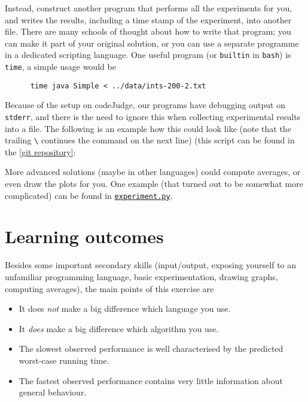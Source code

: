 \documentclass{tufte-handout}
\begin{document}
\begin{description}
    Instead, construct another program that performs all the experiments for you, and writes the results, including a time stamp of the experiment, into another file.
    There are many schools of thought about how to write that program; you can make it part of your original solution, or you can use a separate programme in a dedicated scripting language.
    One useful program (or \texttt{builtin} in \texttt{bash}) is \texttt{time}, a simple usage would be 
    \begin{lstlisting}
      time java Simple < ../data/ints-200-2.txt
    \end{lstlisting}
    Because of the setup on codeJudge, our programs have debugging output on \texttt{stderr}, and there is the need to ignore this when collecting experimental results into a file. 
    The following is an example how this could look like (note that the trailing \verb+\+ continues the command on the next line) (this script can be found in the \href{https://bitbucket.org/rikj/bads-labs/src/master/foursum/src/simpleExp.sh}{[git repository]}:
    

    More advanced solutions (maybe in other languages) could compute averages, or even draw the plots for you.
    One example (that turned out to be somewhat more complicated) can be found in \href{https://bitbucket.org/rikj/bads-labs/src/master/foursum/src/simpleExp.sh}{\texttt{experiment.py}}.
\end{description}

\section{Learning outcomes}

Besides some important secondary skills (input/output, exposing yourself to an unfamiliar programming language, basic experimentation, drawing graphs, computing averages), the main points of this exercise are
\begin{itemize}
  \item It does \emph{not} make a big difference which language you use.
  \item It \emph{does} make a big difference which algorithm you use.
  \item The slowest observed performance is well characterised by the predicted worst-case running time.
  \item The fastest observed performance contains very little information about general behaviour.
\end{itemize}
\end{document}
